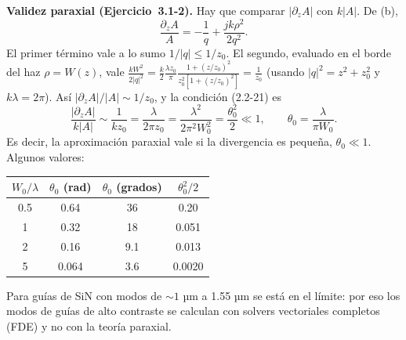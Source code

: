  \textbf{Validez paraxial (Ejercicio~3.1-2).} Hay que comparar $|\partial_zA|$ con $k|A|$. De (b),
\begin{equation*}
\frac{\partial_zA}{A}=-\frac1q+\frac{jk\rho^2}{2q^2}.
\end{equation*}
El primer término vale a lo sumo $1/|q|\le1/z_0$. El segundo, evaluado en el borde del haz $\rho=W(z)$, vale
$\frac{kW^2}{2|q|^2}=\frac{k}{2}\frac{\lambda z_0}{\pi}\frac{1+(z/z_0)^2}{z_0^2[1+(z/z_0)^2]}=\frac{1}{z_0}$ (usando $|q|^2=z^2+z_0^2$ y $k\lambda=2\pi$).
Así $|\partial_zA|/|A|\sim1/z_0$, y la condición (2.2-21) es
\begin{equation*}
\frac{|\partial_zA|}{k|A|}\sim\frac{1}{kz_0}=\frac{\lambda}{2\pi z_0}=\frac{\lambda^2}{2\pi^2W_0^2}=\frac{\theta_0^2}{2}\ll1,
\qquad \theta_0=\frac{\lambda}{\pi W_0}.
\end{equation*}
Es decir, la aproximación paraxial vale si la divergencia es pequeña, $\theta_0\ll1$. Algunos valores:
\begin{center}
\begin{tabular}{@{}cccc@{}}\toprule
$W_0/\lambda$ & $\theta_0$ (rad) & $\theta_0$ (grados) & $\theta_0^2/2$\\\midrule
0.5 & 0.64 & 36 & 0.20\\
1 & 0.32 & 18 & 0.051\\
2 & 0.16 & 9.1 & 0.013\\
5 & 0.064 & 3.6 & 0.0020\\\bottomrule
\end{tabular}
\end{center}
Para guías de SiN con modos de $\sim1$ µm a 1.55 µm se está en el límite: por eso los modos de guías de alto
contraste se calculan con solvers vectoriales completos (FDE) y no con la teoría paraxial.


\label{sol:7}


